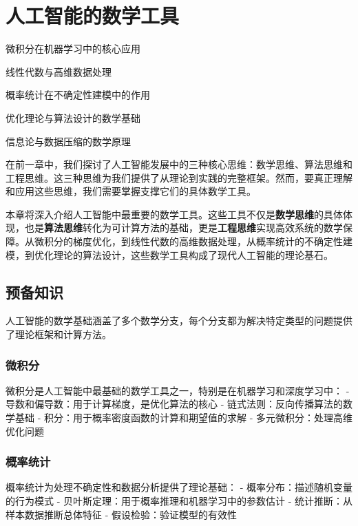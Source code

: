 
\chapter{人工智能的数学工具}

\begin{introduction}
  \item 微积分在机器学习中的核心应用
  \item 线性代数与高维数据处理
  \item 概率统计在不确定性建模中的作用
  \item 优化理论与算法设计的数学基础
  \item 信息论与数据压缩的数学原理
\end{introduction}

在前一章中，我们探讨了人工智能发展中的三种核心思维：数学思维、算法思维和工程思维。这三种思维为我们提供了从理论到实践的完整框架。然而，要真正理解和应用这些思维，我们需要掌握支撑它们的具体数学工具。

本章将深入介绍人工智能中最重要的数学工具。这些工具不仅是{\bf 数学思维}的具体体现，也是{\bf 算法思维}转化为可计算方法的基础，更是{\bf 工程思维}实现高效系统的数学保障。从微积分的梯度优化，到线性代数的高维数据处理，从概率统计的不确定性建模，到优化理论的算法设计，这些数学工具构成了现代人工智能的理论基石。

\section{预备知识}

人工智能的数学基础涵盖了多个数学分支，每个分支都为解决特定类型的问题提供了理论框架和计算方法。

\subsection{微积分}
微积分是人工智能中最基础的数学工具之一，特别是在机器学习和深度学习中：
- 导数和偏导数：用于计算梯度，是优化算法的核心
- 链式法则：反向传播算法的数学基础
- 积分：用于概率密度函数的计算和期望值的求解
- 多元微积分：处理高维优化问题

\subsection{概率统计}
概率统计为处理不确定性和数据分析提供了理论基础：
- 概率分布：描述随机变量的行为模式
- 贝叶斯定理：用于概率推理和机器学习中的参数估计
- 统计推断：从样本数据推断总体特征
- 假设检验：验证模型的有效性

